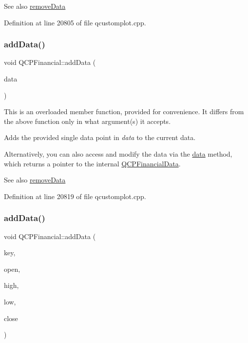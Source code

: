 \begin{DoxySeeAlso}{See also}
\hyperlink{class_q_c_p_financial_a048c741d3c8cc5709c2c44b759fdf27c}{remove\+Data} 
\end{DoxySeeAlso}


Definition at line 20805 of file qcustomplot.\+cpp.

\mbox{\label{class_q_c_p_financial_a3b6144b48a6a8e63236fc5bf70d40c00}} 
\subsubsection{\texorpdfstring{add\+Data()}{addData()}\hspace{0.1cm}{\footnotesize\ttfamily [2/4]}}
{\footnotesize\ttfamily void Q\+C\+P\+Financial\+::add\+Data (\begin{DoxyParamCaption}\item[{const \hyperlink{class_q_c_p_financial_data}{Q\+C\+P\+Financial\+Data} \&}]{data }\end{DoxyParamCaption})}

This is an overloaded member function, provided for convenience. It differs from the above function only in what argument(s) it accepts.

Adds the provided single data point in {\itshape data} to the current data.

Alternatively, you can also access and modify the data via the \hyperlink{class_q_c_p_financial_a528c81578e4f25999a9169127763cfd4}{data} method, which returns a pointer to the internal \hyperlink{class_q_c_p_financial_data}{Q\+C\+P\+Financial\+Data}.

\begin{DoxySeeAlso}{See also}
\hyperlink{class_q_c_p_financial_a048c741d3c8cc5709c2c44b759fdf27c}{remove\+Data} 
\end{DoxySeeAlso}


Definition at line 20819 of file qcustomplot.\+cpp.

\mbox{\label{class_q_c_p_financial_a688bbd052e00a02954ddb0068b378170}} 
\subsubsection{\texorpdfstring{add\+Data()}{addData()}\hspace{0.1cm}{\footnotesize\ttfamily [3/4]}}
{\footnotesize\ttfamily void Q\+C\+P\+Financial\+::add\+Data (\begin{DoxyParamCaption}\item[{double}]{key,  }\item[{double}]{open,  }\item[{double}]{high,  }\item[{double}]{low,  }\item[{double}]{close }\end{DoxyParamCaption})}

